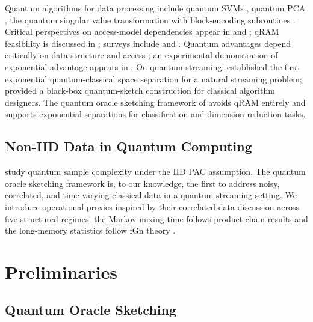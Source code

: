 \documentclass[preprint,12pt,authoryear]{elsarticle}
\begin{document}
Quantum algorithms for data processing include quantum SVMs \citep{rebentrost2014quantum}, quantum PCA \citep{lloyd2014quantum}, the quantum singular value transformation \citep{gilyen2019qsvt} with block-encoding subroutines \citep{chakraborty2019blockencodings}. Critical perspectives on access-model dependencies appear in \citet{aaronson2015readthefineprint} and \citet{tang2019quantum}; qRAM feasibility is discussed in \citet{giovannetti2008quantum}; surveys include \citet{chen2024qmlsurvey} and \citet{schuld2018supervised}. Quantum advantages depend critically on data structure and access \citep{huang2021powerofdata}; an experimental demonstration of exponential advantage appears in \citet{huang2022experiments}. On quantum streaming: \citet{kallaugher2021streaming} established the first exponential quantum-classical space separation for a natural streaming problem; \citet{kallaugher2025designquantum} provided a black-box quantum-sketch construction for classical algorithm designers. The quantum oracle sketching framework of \citet{zhao2026exponential} avoids qRAM entirely and supports exponential separations for classification and dimension-reduction tasks.

\subsection{Non-IID Data in Quantum Computing}

\citet{arunachalam2018optimal} study quantum sample complexity under the IID PAC assumption. The quantum oracle sketching framework \citep{zhao2026exponential} is, to our knowledge, the first to address noisy, correlated, and time-varying classical data in a quantum streaming setting. We introduce operational proxies inspired by their correlated-data discussion across five structured regimes; the Markov mixing time follows product-chain results \citep{levin2017mixing} and the long-memory statistics follow fGn theory \citep{mandelbrot1968fbm, beran1994statistics}.


\section{Preliminaries}
\label{sec:prelim}

\subsection{Quantum Oracle Sketching}
\end{document}
